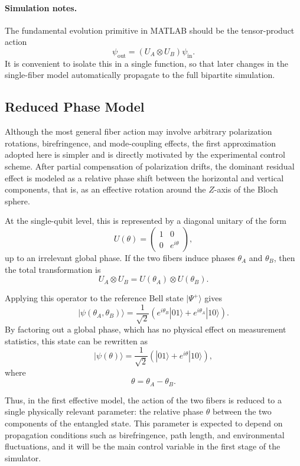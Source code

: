 \documentclass[a4paper]{article}
\begin{document}
\paragraph{Simulation notes.}
The fundamental evolution primitive in MATLAB should be the tensor-product action
\[
\psi_{\mathrm{out}} = (U_A \otimes U_B)\psi_{\mathrm{in}}.
\]
It is convenient to isolate this in a single function, so that later changes in the single-fiber model automatically propagate to the full bipartite simulation.

\subsection{Reduced Phase Model}

Although the most general fiber action may involve arbitrary polarization rotations, birefringence, and mode-coupling effects, the first approximation adopted here is simpler and is directly motivated by the experimental control scheme. After partial compensation of polarization drifts, the dominant residual effect is modeled as a relative phase shift between the horizontal and vertical components, that is, as an effective rotation around the \(Z\)-axis of the Bloch sphere.

At the single-qubit level, this is represented by a diagonal unitary of the form
\[
U(\theta)
=
\begin{pmatrix}
1 & 0\\
0 & e^{i\theta}
\end{pmatrix},
\]
up to an irrelevant global phase. If the two fibers induce phases \(\theta_A\) and \(\theta_B\), then the total transformation is
\[
U_A \otimes U_B
=
U(\theta_A)\otimes U(\theta_B).
\]

Applying this operator to the reference Bell state \( |\Psi^+\rangle \) gives
\[
|\psi(\theta_A,\theta_B)\rangle
=
\frac{1}{\sqrt{2}}
\left(
e^{i\theta_B}|01\rangle
+
e^{i\theta_A}|10\rangle
\right).
\]
By factoring out a global phase, which has no physical effect on measurement statistics, this state can be rewritten as
\[
|\psi(\theta)\rangle
=
\frac{1}{\sqrt{2}}
\left(
|01\rangle
+
e^{i\theta}|10\rangle
\right),
\]
where
\[
\theta = \theta_A - \theta_B.
\]

Thus, in the first effective model, the action of the two fibers is reduced to a single physically relevant parameter: the relative phase \(\theta\) between the two components of the entangled state. This parameter is expected to depend on propagation conditions such as birefringence, path length, and environmental fluctuations, and it will be the main control variable in the first stage of the simulator.
\end{document}
